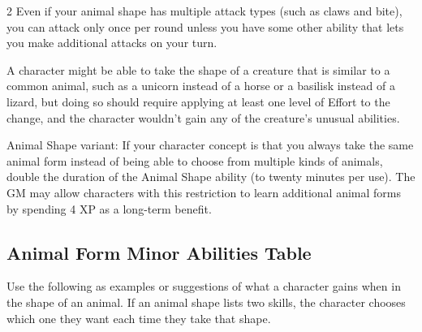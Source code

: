 \begin{multicols}{2}
Even if your animal shape has multiple attack types (such as claws and bite), you can attack only once per round unless you have some other ability that lets you make additional attacks on your turn.

A character might be able to take the shape of a creature that is similar to a common animal, such as a unicorn instead of a horse or a basilisk instead of a lizard, but doing so should require applying at least one level of Effort to the change, and the character wouldn’t gain any of the creature’s unusual abilities.

Animal Shape variant: If your character concept is that you always take the same animal form instead of being able to choose from multiple kinds of animals, double the duration of the Animal Shape ability (to twenty minutes per use). The GM may allow characters with this restriction to learn additional animal forms by spending 4 XP as a long-term benefit.

\subsection{Animal Form Minor Abilities Table}

Use the following as examples or suggestions of what a character gains when in the shape of an animal. If an animal shape lists two skills, the character chooses which one they want each time they take that shape.

\end{multicols}

